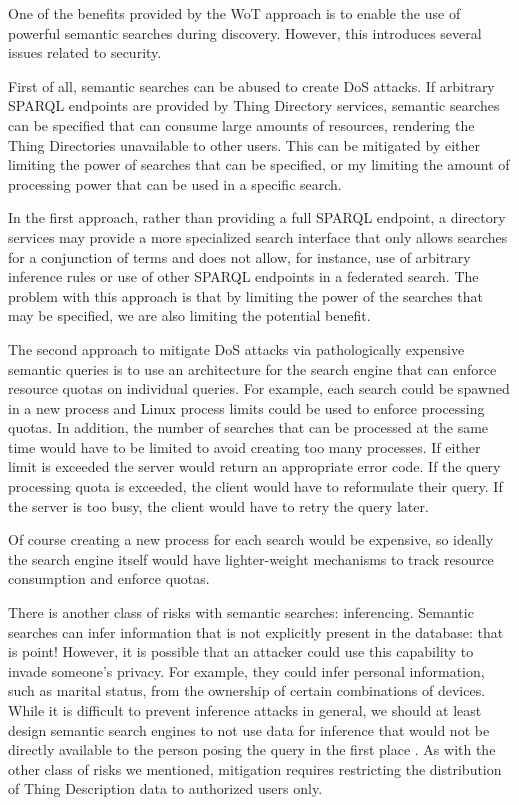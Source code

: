 One of the benefits provided by the WoT approach is to
enable the use of powerful semantic searches during discovery.
However, this introduces several issues related to security.

First of all, semantic searches can be abused to create DoS attacks.
If arbitrary SPARQL endpoints are provided by Thing Directory
services, semantic searches can be specified
that can consume large amounts of resources,
rendering the Thing Directories unavailable to other users.
This can be mitigated by either limiting the power of searches
that can be specified, or my limiting the amount of processing
power that can be used in a specific search.

In the first approach, rather than providing a full
SPARQL endpoint, a directory services may provide a more specialized
search interface that only allows searches for a conjunction of terms
and does not allow, for instance, use of arbitrary inference rules
or use of other SPARQL endpoints in a federated search.
The problem with this approach is that by limiting the power
of the searches that may be specified, we are also limiting the
potential benefit.

The second approach to mitigate DoS attacks via pathologically
expensive semantic queries is to use an architecture for the 
search engine that can enforce resource quotas on individual queries.
For example, each search could be spawned in a new process and Linux
process limits could be used to enforce processing quotas. In addition,
the number of searches that can be processed at the same time would
have to be limited to avoid creating too many processes.
If either limit is exceeded the server would return an appropriate
error code.  If the query processing quota is exceeded, the client
would have to reformulate their query.  If the server is too busy,
the client would have to retry the query later.

Of course creating a new process for each search would be expensive,
so ideally the search engine itself would have lighter-weight
mechanisms to track resource consumption and enforce quotas.

There is another class of risks with semantic searches: 
inferencing.  Semantic searches can infer information that is
not explicitly present in the database: that is point!
However, it is possible that an attacker could use this capability
to invade someone's privacy.  For example, they could infer
personal information, such as marital status, from the ownership
of certain combinations of devices.
While it is difficult to prevent inference attacks in general,
we should at least design semantic search engines to not use 
data for inference that would not be directly available to the
person posing the query in the first place 
\cite{Thura2005a,Xia2014a}.  
As with the other class of risks we mentioned,
mitigation requires restricting the distribution of Thing Description
data to authorized users only.
